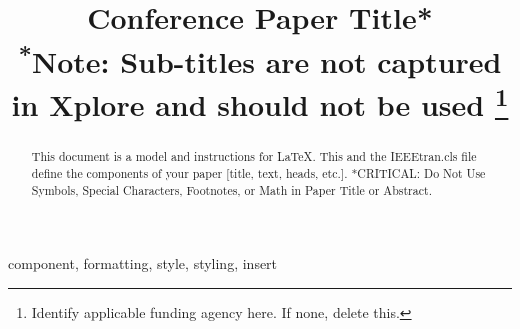 \documentclass[conference]{IEEEtran}
\begin{document}
\title{Conference Paper Title*\\
{\footnotesize \textsuperscript{*}Note: Sub-titles are not captured in Xplore and
should not be used}
\thanks{Identify applicable funding agency here. If none, delete this.}
}

\author{
\and
{}

}

\maketitle

\begin{abstract}
This document is a model and instructions for \LaTeX.
This and the IEEEtran.cls file define the components of your paper [title, text, heads, etc.]. *CRITICAL: Do Not Use Symbols, Special Characters, Footnotes, 
or Math in Paper Title or Abstract.
\end{abstract}

\begin{IEEEkeywords}
component, formatting, style, styling, insert
\end{IEEEkeywords}
\end{document}

